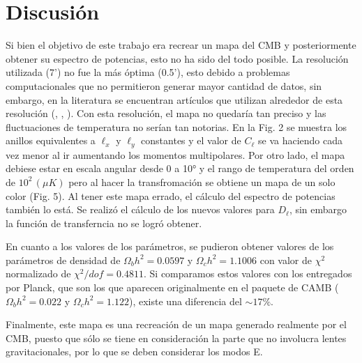 \documentclass[twocolumn,letterpaper,spanish]{revtex4}
\numberwithin{equation}{section}
\begin{document}
\section{Discusi\'on}\label{discusion}

Si bien el objetivo de este trabajo era recrear un mapa del CMB y posteriormente obtener su espectro de potencias, esto no ha sido del todo posible. La resoluci\'on utilizada (7') no fue la m\'as \'optima (0.5'), esto debido a problemas computacionales que no permitieron generar mayor cantidad de datos, sin embargo, en la literatura se encuentran art\'iculos que utilizan alrededor de esta resoluci\'on (\cite{comp1}, \cite{comp2}, \cite{comp3}). Con esta resoluci\'on, el mapa no quedar\'ia tan preciso y las fluctuaciones de temperatura no ser\'ian tan notorias.
En la Fig. 2 se muestra los anillos equivalentes a $\ell_x$ y $\ell_y$ constantes y el valor de $C_{\ell}$ se va haciendo cada vez menor al ir aumentando los momentos multipolares. Por otro lado, el mapa debiese estar en escala angular desde 0 a 10° y el rango de temperatura del orden de $10^2\,(\mu K)$ pero al hacer la transfromaci\'on se obtiene un mapa de un solo color (Fig. 5). Al tener este mapa errado, el c\'alculo del espectro de potencias tambi\'en lo est\'a.
Se realiz\'o el c\'alculo de los nuevos valores para $D_\ell$, sin embargo la funci\'on de transferncia no se logr\'o obtener.


En cuanto a los valores de los par\'ametros, se pudieron obtener valores de los par\'ametros de densidad de $\Omega_b h^2 = 0.0597$ y $\Omega_c h^2 = 1.1006$ con valor de $\chi^2$ normalizado de $\chi^2/dof = 0.4811$. Si comparamos estos valores con los entregados por Planck, que son los que aparecen originalmente en el paquete de CAMB ($\Omega_b h^2 = 0.022$ y $\Omega_c h^2 = 1.122$), existe una diferencia del $\sim 17 \%$.

Finalmente, este mapa es una recreaci\'on de un mapa generado realmente por el CMB, puesto que s\'olo se tiene en consideraci\'on la parte que no involucra lentes gravitacionales, por lo que se deben considerar los modos E.










\end{document}
